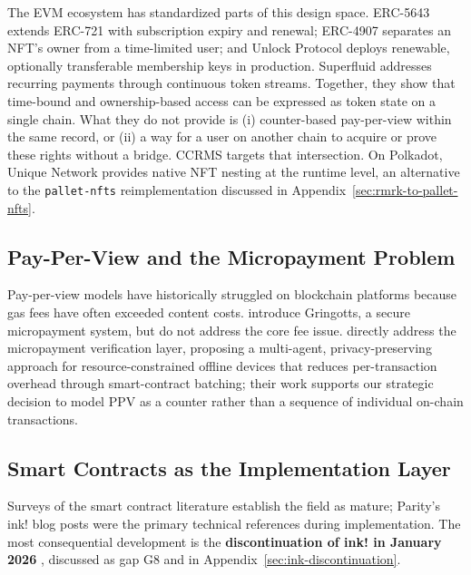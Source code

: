 The EVM ecosystem has standardized parts of this design space. ERC-5643 \citep{cygaar2022} extends ERC-721 with subscription expiry and renewal; ERC-4907 \citep{anders2022} separates an NFT's owner from a time-limited user; and Unlock Protocol \citep{unlockProtocol2026} deploys renewable, optionally transferable membership keys in production. Superfluid \citep{superfluid2026} addresses recurring payments through continuous token streams. Together, they show that time-bound and ownership-based access can be expressed as token state on a single chain. What they do not provide is (i) counter-based pay-per-view within the same record, or (ii) a way for a user on another chain to acquire or prove these rights without a bridge. CCRMS targets that intersection. On Polkadot, Unique Network \citep{uniqueNetwork2026} provides native NFT nesting at the runtime level, an alternative to the \texttt{pallet-nfts} reimplementation discussed in Appendix~\ref{sec:rmrk-to-pallet-nfts}.

\subsection{Pay-Per-View and the Micropayment Problem}\label{subsec:ppv-micropayment}

Pay-per-view models have historically struggled on blockchain platforms because gas fees have often exceeded content costs. \citet{goyalEtAl2019} introduce Gringotts, a secure micropayment system, but do not address the core fee issue. \citet{chegenizadehEtAl2024} directly address the micropayment verification layer, proposing a multi-agent, privacy-preserving approach for resource-constrained offline devices that reduces per-transaction overhead through smart-contract batching; their work supports our strategic decision to model PPV as a counter rather than a sequence of individual on-chain transactions.

\subsection{Smart Contracts as the Implementation Layer}\label{subsec:smart-contracts-impl}

Surveys of the smart contract literature \citep{ante2020, linEtAl2022, singhEtAl2024a, quanEtAl2024} establish the field as mature; Parity's ink! blog posts \citep{parityTechnologiesInk3_2022, parityTechnologiesInk_2022} were the primary technical references during implementation. The most consequential development is the \textbf{discontinuation of ink! in January 2026} \citep{inkAlliance2026}, discussed as gap G8 and in Appendix~\ref{sec:ink-discontinuation}.


